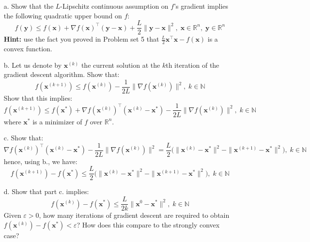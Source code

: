 \documentclass[11pt]{article}
\newcommand{\eps}{\varepsilon}
\theoremstyle{remark}
\newcommand{\N}{\mathbb{N}}                     %
\newcommand{\R}{\mathbb{R}}                     %
\newcommand{\bx}{\mathbf{x}}
\newcommand{\by}{\mathbf{y}}
\begin{document}
\begin{itemize}
    \item[a.] Show that the $L$-Lipschitz continuous assumption on $f$'s
        gradient implies the following quadratic upper bound on $f$:
        \begin{displaymath}
            f(\by) \leq f(\bx) + \nabla f(\bx)^\intercal (\by-\bx)
            + \frac{L}{2} \|\by-\bx\|^2,\;
            \bx\in\R^n,\;\by\in\R^n
        \end{displaymath}
        \textbf{Hint:} use the fact you proved in Problem set 5 that
        $\frac{L}{2} \bx^\intercal\bx - f(\bx)$ is a convex function.
    \item[b.] Let us denote by $\bx^{(k)}$ the current solution at the $k$th
        iteration of the gradient descent algorithm. Show that:
        \begin{displaymath}
            f(\bx^{(k+1)}) \leq f(\bx^{(k)}) - \frac{1}{2L} \|\nabla
            f(\bx^{(k)})\|^2,\; k\in\N
        \end{displaymath}
        Show that this implies:
        \begin{displaymath}
            f(\bx^{(k+1)}) \leq f(\bx^*) + \nabla f(\bx^{(k)})^\intercal
            (\bx^{(k)}-\bx^*) - \frac{1}{2L}\|\nabla f(\bx^{(k)})\|^2,\; k\in\N
        \end{displaymath}
        where $\bx^*$ is a minimizer of $f$ over $\R^n$.
    \item[c.] Show that:
        \begin{displaymath}
            \nabla f(\bx^{(k)})^\intercal
            (\bx^{(k)}-\bx^*) - \frac{1}{2L}\|\nabla f(\bx^{(k)})\|^2
            =
            \frac{L}{2}\big(\|\bx^{(k)} - \bx^*\|^2 
            - \|\bx^{(k+1)} - \bx^*\|^2\big),\;k\in\N
        \end{displaymath}
        hence, using b., we have:
        \begin{displaymath}
            f(\bx^{(k+1)}) - f(\bx^*)\leq
            \frac{L}{2}\big(\|\bx^{(k)} - \bx^*\|^2 
            - \|\bx^{(k+1)} - \bx^*\|^2\big),\;k\in\N
        \end{displaymath}
    \item[d.] Show that part c. implies:
        \begin{displaymath}
            f(\bx^{(k)}) - f(\bx^*)\leq
            \frac{L}{2k}\|\bx^0 - \bx^*\|^2,\;k\in\N
        \end{displaymath}
        Given $\eps> 0$, how many iterations of gradient descent are required
        to obtain $f(\bx^{(k)}) - f(\bx^*)<\eps$? How does this compare to the
        strongly convex case?
\end{itemize}
\end{document}
